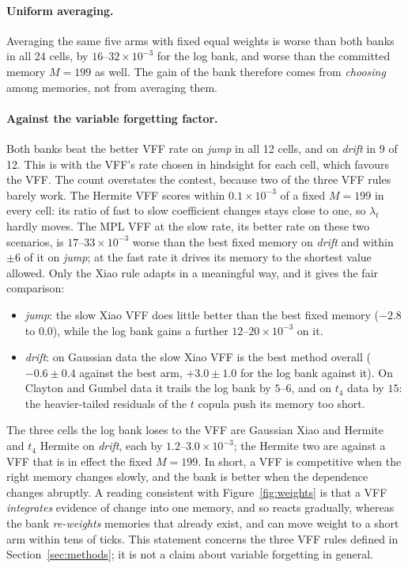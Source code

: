 \paragraph{Uniform averaging.} Averaging the same five arms with fixed equal weights is worse than
both banks in all 24 cells, by $16$--$32\times10^{-3}$ for the log bank, and worse than the
committed memory $M=199$ as well. The gain of the bank therefore comes from \emph{choosing} among
memories, not from averaging them.

\paragraph{Against the variable forgetting factor.} Both banks beat the better VFF rate on
\emph{jump} in all 12 cells, and on \emph{drift} in 9 of 12. This is with the VFF's rate chosen
in hindsight for each cell, which favours the VFF. The count overstates the contest, because two
of the three VFF rules barely work. The Hermite VFF scores within $0.1\times10^{-3}$ of a fixed
$M=199$ in every cell: its ratio of fast to slow coefficient changes stays close to one, so
$\lambda_t$ hardly moves. The MPL VFF at the slow rate, its better rate on these two scenarios,
is $17$--$33\times10^{-3}$ worse than the best fixed memory on \emph{drift} and within $\pm6$ of it
on \emph{jump}; at the fast rate it drives its memory to the shortest value allowed. Only the Xiao rule adapts in a meaningful way, and it
gives the fair comparison:
\begin{itemize}
  \item \emph{jump}: the slow Xiao VFF does little better than the best fixed memory ($-2.8$ to
    $0.0$), while the log bank gains a further $12$--$20\times10^{-3}$ on it.
  \item \emph{drift}: on Gaussian data the slow Xiao VFF is the best method overall
    ($-0.6\pm0.4$ against the best arm, $+3.0\pm1.0$ for the log bank against it). On Clayton and
    Gumbel data it trails the log bank by $5$--$6$, and on $t_4$ data by $15$: the heavier-tailed
    residuals of the $t$ copula push its memory too short.
\end{itemize}
The three cells the log bank loses to the VFF are Gaussian Xiao and Hermite and $t_4$ Hermite on
\emph{drift}, each by $1.2$--$3.0\times10^{-3}$; the Hermite two are against a VFF that is in
effect the fixed $M=199$. In short, a VFF is competitive when the right memory changes slowly,
and the bank is better when the dependence changes abruptly. A reading consistent with
Figure~\ref{fig:weights} is that a VFF \emph{integrates} evidence of change into one memory, and
so reacts gradually, whereas the bank \emph{re-weights} memories that already exist, and can move
weight to a short arm within tens of ticks. This statement concerns the three VFF rules defined
in Section~\ref{sec:methods}; it is not a claim about variable forgetting in general.

